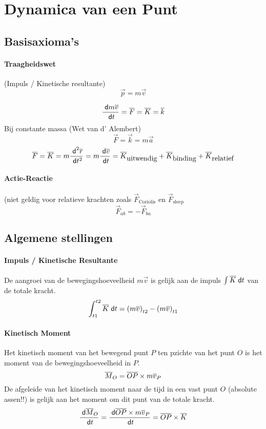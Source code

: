 \newpage
\section{Dynamica van een Punt}
\label{sec:DynamicaPunt}
\subsection{Basisaxioma's}
\label{sec:Basisaxiomas}

\paragraph{Traagheidswet}
(Impuls / Kinetische resultante)
\[
  \vec{p} = m \vec{v}
\]

\[
  \frac{\;\textsf{d}m\overline{v}}{\;\textsf{d}t} = \overline{F} = \overline{K} = \overline{k}
\]
Bij constante massa (Wet van d' Alembert)
\[
  \vec{F} = \vec{k} = m\vec{a}
\]
\[
  \overline{F} = \overline{K}
          = m \frac{\;\textsf{d}^2{\overline{r}}}{\;\textsf{d}t^2}
          = m \frac{\;\textsf{d}\overline{v}}{\;\textsf{d}t} 
          = \overline{K}_{\mbox{uitwendig}} + \overline{K}_{\mbox{binding}} + \overline{K}_{\mbox{relatief}}
\]

\paragraph{Actie-Reactie} (niet geldig voor relatieve krachten zoals $\vec{F}_{\mbox{Coriolis}}$ en $\vec{F}_{\mbox{sleep}}$
\[
  \vec{F}_{ab} = - \vec{F}_{ba}
\]

\subsection{Algemene stellingen}
\label{sec:AlgStellingenDynPunt}

\paragraph{Impuls / Kinetische Resultante}\par
De aangroei van de bewegingshoeveelheid $m\vec{v}$ is gelijk aan de impuls $\int \overline{K} \;\textsf{d}t$ van de totale kracht.
\[
  \int_{t1}^{t2} \overline{K} \;\textsf{d}t = \left(m \overline{v}\right)_{t2} - \left(m \overline{v}\right)_{t1}
\]

\paragraph{Kinetisch Moment}\par
Het kinetisch moment van het bewegend punt $P$ ten pzichte van het punt $O$ is het moment van de bewegingshoeveelheid in $P$.
\[
 \overline{M}_O = \overline{OP} \times m\overline{v}_P
\]
De afgeleide van het kinetisch moment naar de tijd in een vast punt $O$ (absolute assen!!) is gelijk aan het moment om dit punt van de totale kracht.
\[
  \frac{\;\textsf{d}\overline{M}_O}{\;\textsf{d}t} = \frac{\;\textsf{d}\overline{OP} \times m\overline{v}_P}{\;\textsf{d}t}
                              = \overline{OP} \times \overline{K}
\]

